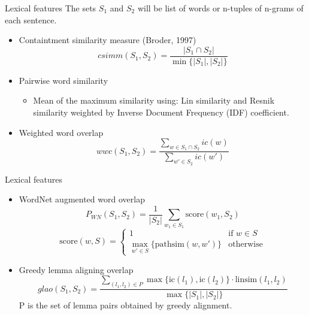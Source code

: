     \begin{frame}{Lexical features}
        The sets $S_1$ and $S_2$ will be list of words or n-tuples of n-grams of each sentence. \\
        \begin{itemize}
            \item Containtment similarity measure (Broder, 1997)
            \[
            csimm(S_1,S_2) = \frac{\left| S_1 \cap S_2 \right|}{\min \{ \left| S_1 \right|, \left| S_2 \right| \}}
            \]
            \item Pairwise word similarity \\ 
            \begin{itemize}
                \item Mean of the maximum similarity using: Lin similarity and Resnik similarity weighted by Inverse Document Frequency (IDF) coefficient.

            \end{itemize}

            \item Weighted word overlap 
            \[
            wwc(S_1, S_2) = 
            \frac{\sum_{w \in S_1 \cap S_2} ic(w)}{\sum_{w' \in S_2} ic(w')}
            \]
        \end{itemize}
\end{frame}

\begin{frame}{Lexical features}
    \begin{itemize}
    \item WordNet augmented word overlap 
    \[ P_{WN}(S_1, S_2) = \frac{1}{|S_2|} \sum_{w_1 \in S_1} \text{score}(w_1, S_2)\]
    \[
    \text{score}(w, S) = 
    \begin{cases} 
    1 & \text{if } w \in S \\ 
    \max_{w' \in S} \{\text{pathsim}(w, w')\} & \text{otherwise}
    \end{cases}
    \]
    \vspace{0.3cm}
\item Greedy lemma aligning overlap
    \[ glao(S_1, S_2) = \frac{\sum_{(l_1, l_2) \in P} \max \{ \text{ic}(l_1), \text{ic}(l_2) \} \cdot \text{linsim}(l_1, l_2)}{\max \{|S_1|, |S_2|\}} \]
    P is the set of lemma pairs obtained by greedy alignment.
\end{itemize}
\end{frame}

